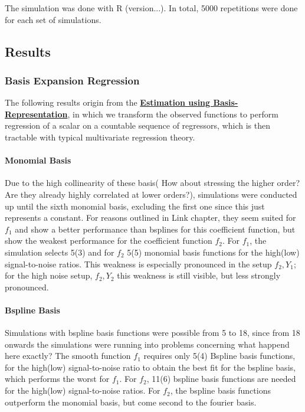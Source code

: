 \documentclass[11pt,twoside,a4paper]{article}
\begin{document}
	
		 The simulation was done with R (version...). In total, 5000 repetitions were done for each set of simulations. 
		
	
	\subsection{Results}	
	
	\subsubsection{Basis Expansion Regression}
	The following results origin from the \hyperref[basis_exp_transf]{\textbf{Estimation using Basis-Representation}}, in which we transform the observed functions to perform regression of a scalar on a countable sequence of regressors, which is then tractable with typical multivariate regression theory. 
	
	\paragraph{Monomial Basis}
	Due to the high collinearity of these basis{(\color{orange} How about stressing the higher order? Are they already highly correlated at lower orders?)}, simulations were conducted up until the sixth monomial basis, excluding the first one since this just represents a constant. For reasons outlined in {\color{green} Link chapter}, they seem suited for $f_1$ and show a better performance than bsplines for this coefficient function, but show the weakest performance for the coefficient function $f_2$. For $f_1$, the simulation selects 5(3) and for $f_2$ 5(5) monomial basis functions for the high(low) signal-to-noise ratios. This weakness is especially pronounced in the setup $f_2,Y_1$; for the high noise setup, $f_2, Y_2$ this weakness is still visible, but less strongly pronounced.
	
	\paragraph{Bspline Basis}
	Simulations with bspline basis functions were possible from 5 to 18, since from 18 onwards the simulations were running into problems concerning {\color{green} what happend here exactly?}
The smooth function $f_1$ requires only 5(4) Bspline basis functions, for the high(low) signal-to-noise ratio to obtain the best fit for the bspline basis, which performs the worst for $f_1$. For $f_2$, 11(6) bspline basis functions are needed for the high(low) signal-to-noise ratios. For $f_2$, the bspline basis functions outperform the monomial basis, but come second to the fourier basis.
	
\end{document}
